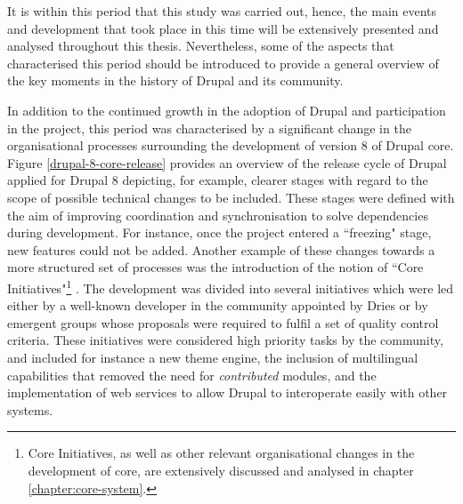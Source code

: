 It is within this period that this study was carried out, hence, the main events and development that took place in this time will be extensively presented and analysed throughout this thesis. Nevertheless, some of the aspects that characterised this period should be introduced to provide a general overview of the key moments in the history of Drupal and its community. 

In addition to the continued growth in the adoption of Drupal and participation in the project, this period was characterised by a significant change in the organisational processes surrounding the development of version 8 of Drupal core. Figure \ref{drupal-8-core-release} provides an overview of the release cycle of Drupal applied for Drupal 8 \parencite{drupal-core-release-cycle:2014:Online} depicting, for example, clearer stages with regard to the scope of possible technical changes to be included. These stages were defined with the aim of improving coordination and synchronisation to solve dependencies during development. For instance, once the project entered a ``freezing" stage, new features could not be added. Another example of these changes towards a more structured set of processes was the introduction of the notion of ``Core Initiatives"\footnote{Core Initiatives, as well as other relevant organisational changes in the development of core, are extensively discussed and analysed in chapter \ref{chapter:core-system}.} \parencite{drupal-core-initiatives:Online}. The development was divided into several initiatives which were led either by a well-known developer in the community \parencite{drupal-core-initiatives:Online} appointed by Dries or by emergent groups whose proposals were required to fulfil a set of quality control criteria. These initiatives were considered high priority tasks by the community, and included for instance a new theme engine, the inclusion of multilingual capabilities that removed the need for \textit{contributed} modules, and the implementation of web services to allow Drupal to interoperate easily with other systems.

